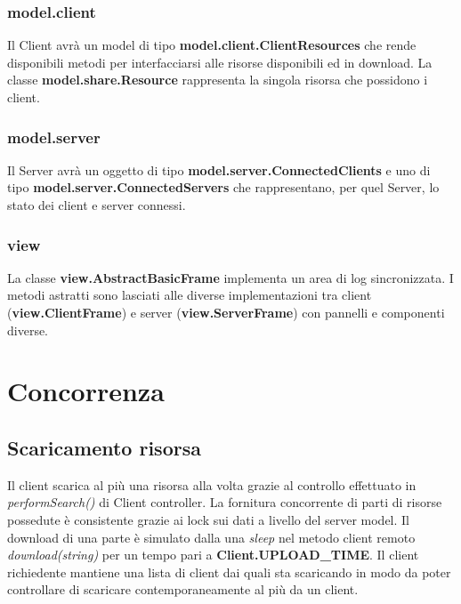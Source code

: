 \documentclass[
10pt, %
a4paper, %
oneside, %
BCOR5mm, %
]{scrartcl}
\begin{document}
 		\subsubsection{model.client}
 			
 			Il Client avrà un model di tipo \textbf{model.client.ClientResources} che rende disponibili metodi per interfacciarsi alle risorse disponibili ed in download.
 			La classe \textbf{model.share.Resource} rappresenta la singola risorsa che possidono i client.
 			
 		\subsubsection{model.server}

 			Il Server avrà un oggetto di tipo \textbf{model.server.ConnectedClients} e uno di tipo \textbf{model.server.ConnectedServers} che rappresentano, per quel Server, lo stato dei client e server connessi.

 		\subsubsection{view}

 			La classe \textbf{view.AbstractBasicFrame} implementa un area di log sincronizzata. I metodi astratti sono lasciati alle diverse implementazioni tra client (\textbf{view.ClientFrame}) e server (\textbf{view.ServerFrame}) con pannelli e componenti diverse.


\section{Concorrenza}

	\subsection{Scaricamento risorsa}
	Il client scarica al più una risorsa alla volta grazie al controllo effettuato in \emph{performSearch()} di Client controller. La fornitura concorrente di parti di risorse possedute è consistente grazie ai lock sui dati a livello del server model. Il download di una parte è simulato dalla una \emph{sleep} nel metodo client remoto \textit{download(string)} per un tempo pari a \textbf{Client.UPLOAD\_TIME}. Il client richiedente mantiene una lista di client dai quali sta scaricando in modo da poter controllare di scaricare contemporaneamente al più da un client. 
\end{document}
